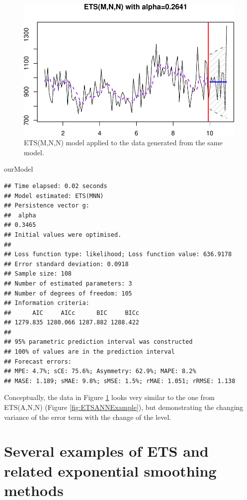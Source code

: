 \documentclass[
]{book}
\newenvironment{Shaded}{\begin{snugshade}}{\end{snugshade}}
\newcommand{\NormalTok}[1]{#1}
\theoremstyle{definition}
\theoremstyle{definition}
\theoremstyle{definition}
\theoremstyle{definition}
\theoremstyle{remark}
\begin{document}
\begin{figure}
\centering
\includegraphics{Svetunkov--2022----ADAM_files/figure-latex/ETSMNNExample-1.pdf}
\caption{\label{fig:ETSMNNExample}ETS(M,N,N) model applied to the data generated from the same model.}
\end{figure}

\begin{Shaded}
\begin{Highlighting}[]
\NormalTok{ourModel}
\end{Highlighting}
\end{Shaded}

\begin{verbatim}
## Time elapsed: 0.02 seconds
## Model estimated: ETS(MNN)
## Persistence vector g:
##  alpha 
## 0.3465 
## Initial values were optimised.
## 
## Loss function type: likelihood; Loss function value: 636.9178
## Error standard deviation: 0.0918
## Sample size: 108
## Number of estimated parameters: 3
## Number of degrees of freedom: 105
## Information criteria:
##      AIC     AICc      BIC     BICc 
## 1279.835 1280.066 1287.882 1288.422 
## 
## 95% parametric prediction interval was constructed
## 100% of values are in the prediction interval
## Forecast errors:
## MPE: 4.7%; sCE: 75.6%; Asymmetry: 62.9%; MAPE: 8.2%
## MASE: 1.189; sMAE: 9.8%; sMSE: 1.5%; rMAE: 1.051; rRMSE: 1.138
\end{verbatim}

Conceptually, the data in Figure \ref{fig:ETSMNNExample} looks very similar to the one from ETS(A,N,N) (Figure \ref{fig:ETSANNExample}), but demonstrating the changing variance of the error term with the change of the level.

\hypertarget{ETSExamples}{%
\section{Several examples of ETS and related exponential smoothing methods}\label{ETSExamples}}
\end{document}
